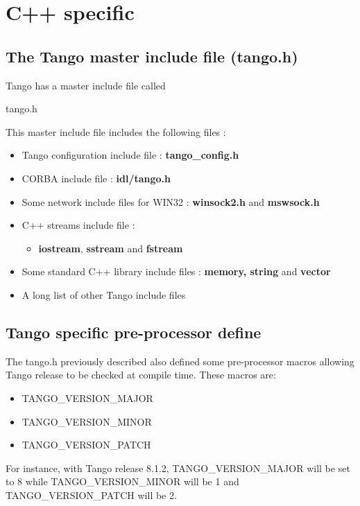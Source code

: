 \vspace{0.3cm}



\section{C++ specific}


\subsection{The Tango master include file (tango.h)}

Tango has a master include file called \begin{center}tango.h\end{center} This
master include file includes the following files :
\begin{itemize}
\item Tango configuration include file : \textbf{tango\_config.h}
\item CORBA include file : \textbf{idl/tango.h}
\item Some network include files for WIN32 : \textbf{winsock2.h} and \textbf{mswsock.h}
\item C++ streams include file :

\begin{itemize}
\item \textbf{iostream}, \textbf{sstream} and \textbf{fstream} 
\end{itemize}
\item Some standard C++ library include files : \textbf{memory, string}
and \textbf{vector}
\item A long list of other Tango include files
\end{itemize}

\subsection{Tango specific pre-processor define}

The tango.h previously described also defined some pre-processor macros
allowing Tango release to be checked at compile time. These macros
are:
\begin{itemize}
\item TANGO\_VERSION\_MAJOR
\item TANGO\_VERSION\_MINOR
\item TANGO\_VERSION\_PATCH
\end{itemize}
For instance, with Tango release 8.1.2, TANGO\_VERSION\_MAJOR will
be set to 8 while TANGO\_VERSION\_MINOR will be 1 and TANGO\_VERSION\_PATCH
will be 2.


